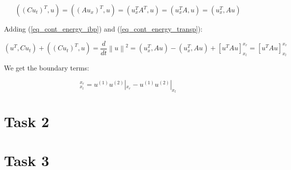 \documentclass[12pt]{article}
\newcommand{\norm}[1]{\left\lVert#1\right\rVert}
\begin{document}
\begin{equation}\label{eq_cont_energy_transp}
    ((Cu_t)^T, u) = ((Au_x)^T, u) = (u_x^TA^T, u) = (u_x^TA, u) = (u_x^T, Au)
\end{equation}

\noindent Adding (\ref{eq_cont_energy_ibp}) and (\ref{eq_cont_energy_transp}):

\begin{equation}
    (u^T, Cu_t) + ((Cu_t)^T, u) = \frac{d}{dt}\norm{u}^2 = (u_x^T, Au) - (u^T_x, Au) + [u^TAu]_{x_l}^{x_r} = [u^TAu]_{x_l}^{x_r}
\end{equation}

\noindent We get the boundary terms:

\begin{equation}
    [u^TAu]_{x_l}^{x_r} = u^{(1)}u^{(2)}|_{x_r} - u^{(1)}u^{(2)}|_{x_l}
\end{equation}



\section{Task 2}

\section{Task 3}
\end{document}
